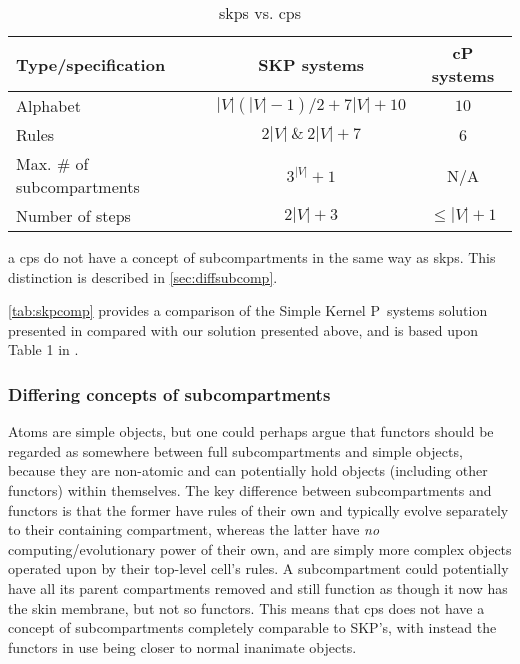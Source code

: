 \begin{table}
\begin{threeparttable}
\centering
\caption{\acrlong{skps} vs. \gls{cps}}
\label{tab:skpcomp}
\begin{tabular}{@{}lcc@{}}
\toprule
Type/specification                & SKP systems        & cP systems \\ \midrule
Alphabet                          & \(|V|(|V|-1)/2 + 7|V| + 10\) & \(10\)         \\
Rules                             & \(2|V|~\&~2|V| + 7\)       & 6          \\
Max. \# of subcompartments & \(3^|V| + 1\)             & N/A\tnote{a}          \\
Number of steps                   & \(2|V| + 3\)             & \(\leq |V| + 1\)         \\ \bottomrule
\end{tabular}%
\begin{tablenotes}
\item[a] \gls{cps} do not have a concept of subcompartments in the same way as \gls{skps}.  This distinction is described in \autoref{sec:diffsubcomp}.
\end{tablenotes}
\end{threeparttable}
\end{table}


\autoref{tab:skpcomp} provides a comparison of the Simple Kernel P~systems solution presented in \cite{Gheorghe2013} compared with our solution presented above, and is based upon Table 1 in \cite{Gheorghe2013}.  

\subsubsection{\label{sec:diffsubcomp}Differing concepts of subcompartments}
Atoms are simple objects, but one could perhaps argue that functors should be regarded as somewhere between full subcompartments and simple objects, because they are non-atomic and can potentially hold objects (including other functors) within themselves.  The key difference between subcompartments and functors is that the former have rules of their own and typically evolve separately to their containing compartment, whereas the latter have \emph{no} computing/evolutionary power of their own, and are simply more complex objects operated upon by their top-level cell's rules.  A subcompartment could potentially have all its parent compartments removed and still function as though it now has the skin membrane, but not so functors.  This means that \gls{cps} does not have a concept of subcompartments completely comparable to SKP's, with instead the functors in use being closer to normal inanimate objects.

